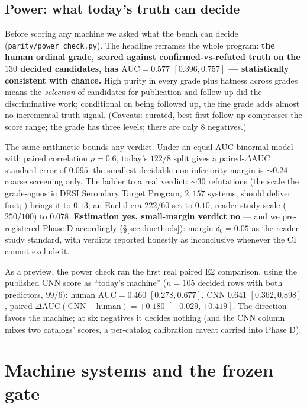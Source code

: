 \documentclass[11pt,letterpaper]{article}
\newcommand{\dauc}{\ensuremath{\Delta\mathrm{AUC}}}
\begin{document}
\subsection{Power: what today's truth can decide}\label{sec:power}
Before scoring any machine we asked what the bench can decide
(\texttt{parity/power\_check.py}). The headline reframes the whole program:
\textbf{the human ordinal grade, scored against confirmed-vs-refuted truth on the $130$
decided candidates, has $\mathrm{AUC}=0.577$ $[0.396,0.757]$ --- statistically
consistent with chance.} High purity in every grade plus flatness across grades means
the \emph{selection} of candidates for publication and follow-up did the
discriminative work; conditional on being followed up, the fine grade adds almost no
incremental truth signal. (Caveats: curated, best-first follow-up compresses the score
range; the grade has three levels; there are only $8$ negatives.)

The same arithmetic bounds any verdict. Under an equal-AUC binormal model with paired
correlation $\rho=0.6$, today's $122/8$ split gives a paired-\dauc{} standard error of
$0.095$: the smallest decidable non-inferiority margin is ${\sim}0.24$ --- coarse
screening only. The ladder to a real verdict: ${\sim}30$ refutations (the scale the
grade-agnostic DESI Secondary Target Program, $2{,}157$ systems, should deliver first;
\citealt{huang2025foundry2}) brings it to $0.13$; an Euclid-era $222/60$ set to $0.10$;
reader-study scale ($250/100$) to $0.078$. \textbf{Estimation yes, small-margin verdict
no} --- and we pre-registered Phase D accordingly (\S\ref{sec:dmethods}): margin
$\delta_0=0.05$ as the reader-study standard, with verdicts reported honestly as
inconclusive whenever the CI cannot exclude it.

As a preview, the power check ran the first real paired E2 comparison, using the
published CNN score as ``today's machine'' ($n=105$ decided rows with both predictors,
$99/6$): human $\mathrm{AUC}=0.460$ $[0.278,0.677]$, CNN $0.641$ $[0.362,0.898]$,
paired $\dauc(\mathrm{CNN}-\mathrm{human})=+0.180$ $[-0.029,+0.419]$. The direction
favors the machine; at six negatives it decides nothing (and the CNN column mixes two
catalogs' scores, a per-catalog calibration caveat carried into Phase D).

\section{Machine systems and the frozen gate}\label{sec:machines}
\end{document}
